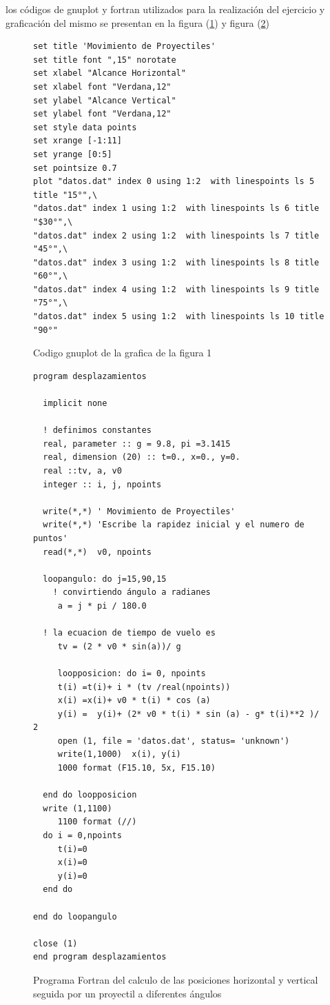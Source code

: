 \documentclass[12pt,a4paper,twoside]{article}
\begin{document}
los códigos de gnuplot y fortran utilizados para la realización del ejercicio y graficación del mismo se presentan en la figura (\ref{fig:figura2}) y figura (\ref{fig:figura3})
\vspace{0.5cm}

\begin{figure}[h]
 \centering 
\begin{verbatim}
set title 'Movimiento de Proyectiles'
set title font ",15" norotate
set xlabel "Alcance Horizontal"
set xlabel font "Verdana,12"
set ylabel "Alcance Vertical"
set ylabel font "Verdana,12"
set style data points
set xrange [-1:11]
set yrange [0:5]
set pointsize 0.7
plot "datos.dat" index 0 using 1:2  with linespoints ls 5 title "15°",\
"datos.dat" index 1 using 1:2  with linespoints ls 6 title "$30°",\
"datos.dat" index 2 using 1:2  with linespoints ls 7 title "45°",\
"datos.dat" index 3 using 1:2  with linespoints ls 8 title "60°",\
"datos.dat" index 4 using 1:2  with linespoints ls 9 title "75°",\
"datos.dat" index 5 using 1:2  with linespoints ls 10 title "90°"
\end{verbatim}

\caption{Codigo gnuplot de la grafica de la figura 1}
\label{fig:figura2}
\end{figure}

\begin{figure}[h]
 \centering
\begin{verbatim}
program desplazamientos

  implicit none

  ! definimos constantes
  real, parameter :: g = 9.8, pi =3.1415
  real, dimension (20) :: t=0., x=0., y=0.
  real ::tv, a, v0
  integer :: i, j, npoints
  
  write(*,*) ' Movimiento de Proyectiles'
  write(*,*) 'Escribe la rapidez inicial y el numero de puntos'
  read(*,*)  v0, npoints

  loopangulo: do j=15,90,15
    ! convirtiendo ángulo a radianes
     a = j * pi / 180.0

  ! la ecuacion de tiempo de vuelo es
     tv = (2 * v0 * sin(a))/ g
     
     loopposicion: do i= 0, npoints
     t(i) =t(i)+ i * (tv /real(npoints))
     x(i) =x(i)+ v0 * t(i) * cos (a)
     y(i) =  y(i)+ (2* v0 * t(i) * sin (a) - g* t(i)**2 )/ 2
     open (1, file = 'datos.dat', status= 'unknown')
     write(1,1000)  x(i), y(i)
     1000 format (F15.10, 5x, F15.10)
     
  end do loopposicion
  write (1,1100)
     1100 format (//)
  do i = 0,npoints
     t(i)=0
     x(i)=0
     y(i)=0
  end do
 
end do loopangulo

close (1)
end program desplazamientos
\end{verbatim}
\caption{Programa Fortran del calculo de las posiciones horizontal y vertical seguida por un proyectil a diferentes ángulos}
\label{fig:figura3} 
\end{figure}
\end{document}

